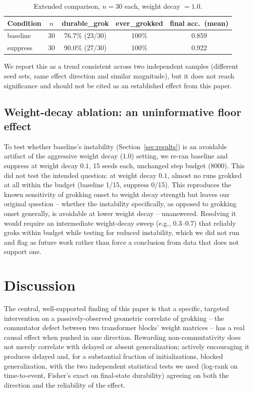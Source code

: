 \documentclass[11pt]{article}
\begin{document}
\begin{table}[t]
\centering
\small
\caption{Extended comparison, $n=30$ each, weight decay $=1.0$.}
\label{tab:extended}
\begin{tabular}{lcccc}
\toprule
Condition & $n$ & durable\_grok & ever\_grokked & final acc.\ (mean) \\
\midrule
baseline & 30 & 76.7\% (23/30) & 100\% & 0.859 \\
suppress & 30 & 90.0\% (27/30) & 100\% & 0.922 \\
\bottomrule
\end{tabular}
\end{table}

We report this as a trend consistent across two independent samples
(different seed sets, same effect direction and similar magnitude), but
it does not reach significance and should not be cited as an established
effect from this paper.

\subsection{Weight-decay ablation: an uninformative floor effect}
\label{sec:wdablation}

To test whether baseline's instability (Section~\ref{sec:results}) is an
avoidable artifact of the aggressive weight decay ($1.0$) setting, we
re-ran baseline and suppress at weight decay $0.1$, 15 seeds each,
unchanged step budget (8000). This did not test the intended question:
at weight decay $0.1$, almost no runs grokked at all within the budget
(baseline 1/15, suppress 0/15). This reproduces the known sensitivity of
grokking onset to weight decay strength \citep{power2022grokking} but
leaves our original question -- whether the instability specifically, as
opposed to grokking onset generally, is avoidable at lower weight decay --
unanswered. Resolving it would require an intermediate weight-decay sweep
(e.g., $0.3$--$0.7$) that reliably groks within budget while testing for
reduced instability, which we did not run and flag as future work rather
than force a conclusion from data that does not support one.

\section{Discussion}

The central, well-supported finding of this paper is that a specific,
targeted intervention on a passively-observed geometric correlate of
grokking -- the commutator defect between two transformer blocks' weight
matrices -- has a real causal effect when pushed in one direction.
Rewarding non-commutativity does not merely correlate with delayed or
absent generalization; actively encouraging it produces delayed and, for
a substantial fraction of initializations, blocked generalization,
with the two independent statistical tests we used (log-rank on
time-to-event, Fisher's exact on final-state durability) agreeing on both
the direction and the reliability of the effect.
\end{document}
